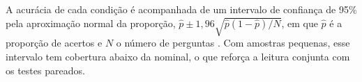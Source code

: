 A acurácia de cada condição é acompanhada de um intervalo de confiança
de 95\% pela aproximação normal da proporção,
$\hat{p} \pm 1{,}96\sqrt{\hat{p}(1-\hat{p})/N}$, em que $\hat{p}$ é a
proporção de acertos e $N$ o número de perguntas
\cite{agresti1998approximate}. Com amostras pequenas, esse intervalo tem
cobertura abaixo da nominal, o que reforça a leitura conjunta com os
testes pareados.

